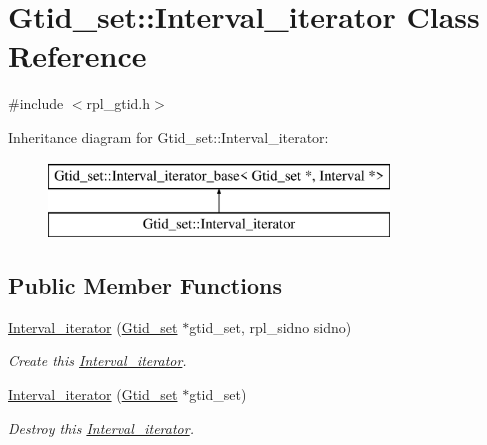 \hypertarget{classGtid__set_1_1Interval__iterator}{}\section{Gtid\+\_\+set\+:\+:Interval\+\_\+iterator Class Reference}
\label{classGtid__set_1_1Interval__iterator}


{\ttfamily \#include $<$rpl\+\_\+gtid.\+h$>$}

Inheritance diagram for Gtid\+\_\+set\+:\+:Interval\+\_\+iterator\+:\begin{figure}[H]
\begin{center}
\leavevmode
\includegraphics[height=2.000000cm]{classGtid__set_1_1Interval__iterator}
\end{center}
\end{figure}
\subsection*{Public Member Functions}
\begin{DoxyCompactItemize}
\item 
\mbox{\label{classGtid__set_1_1Interval__iterator_aef2467c6029a1bf88f96e767b3406f54}} 
\mbox{\hyperlink{classGtid__set_1_1Interval__iterator_aef2467c6029a1bf88f96e767b3406f54}{Interval\+\_\+iterator}} (\mbox{\hyperlink{classGtid__set}{Gtid\+\_\+set}} $\ast$gtid\+\_\+set, rpl\+\_\+sidno sidno)
\begin{DoxyCompactList}\small\item\em Create this \mbox{\hyperlink{classGtid__set_1_1Interval__iterator}{Interval\+\_\+iterator}}. \end{DoxyCompactList}\item 
\mbox{\label{classGtid__set_1_1Interval__iterator_a77fcaac128a0d18294e57b2b1566ae20}} 
\mbox{\hyperlink{classGtid__set_1_1Interval__iterator_a77fcaac128a0d18294e57b2b1566ae20}{Interval\+\_\+iterator}} (\mbox{\hyperlink{classGtid__set}{Gtid\+\_\+set}} $\ast$gtid\+\_\+set)
\begin{DoxyCompactList}\small\item\em Destroy this \mbox{\hyperlink{classGtid__set_1_1Interval__iterator}{Interval\+\_\+iterator}}. \end{DoxyCompactList}\end{DoxyCompactItemize}
